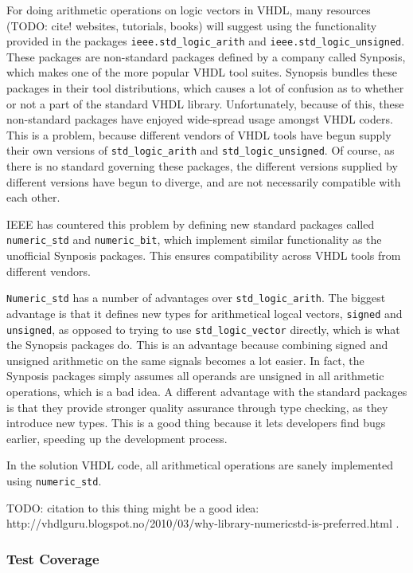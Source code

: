 For doing arithmetic operations on logic vectors in VHDL, many resources (TODO: cite! websites, tutorials, books) will suggest using the functionality provided in the packages \texttt{ieee.std\_logic\_arith} and \texttt{ieee.std\_logic\_unsigned}.
These packages are non-standard packages defined by a company called Synposis, which makes one of the more popular VHDL tool suites.
Synopsis bundles these packages in their tool distributions, which causes a lot of confusion as to whether or not a part of the standard VHDL library.
Unfortunately, because of this, these non-standard packages have enjoyed wide-spread usage amongst VHDL coders.
This is a problem, because different vendors of VHDL tools have begun supply their own versions of \texttt{std\_logic\_arith} and \texttt{std\_logic\_unsigned}.
Of course, as there is no standard governing these packages, the different versions supplied by different versions have begun to diverge, and are not necessarily compatible with each other.

IEEE has countered this problem by defining new standard packages called \texttt{numeric\_std} and \texttt{numeric\_bit}, which implement similar functionality as the unofficial Synposis packages.
This ensures compatibility across VHDL tools from different vendors.

\texttt{Numeric\_std} has a number of advantages over \texttt{std\_logic\_arith}.
The biggest advantage is that it defines new types for arithmetical logcal vectors, \texttt{signed} and \texttt{unsigned}, as opposed to trying to use \texttt{std\_logic\_vector} directly, which is what the Synopsis packages do.
This is an advantage because combining signed and unsigned arithmetic on the same signals becomes a lot easier.
In fact, the Synposis packages simply assumes all operands are unsigned in all arithmetic operations, which is a bad idea.
A different advantage with the standard packages is that they provide stronger quality assurance through type checking, as they introduce new types.
This is a good thing because it lets developers find bugs earlier, speeding up the development process.

In the solution VHDL code, all arithmetical operations are sanely implemented using \texttt{numeric\_std}.

TODO: citation to this thing might be a good idea: http://vhdlguru.blogspot.no/2010/03/why-library-numericstd-is-preferred.html .

\subsubsection{Test Coverage}

